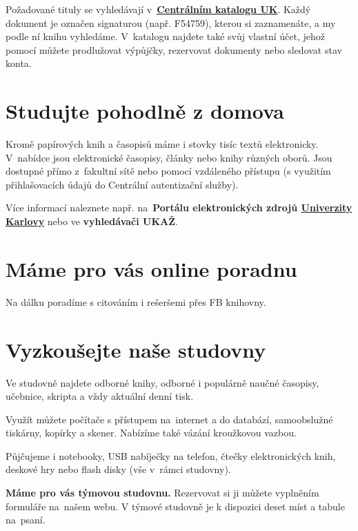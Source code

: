 Požadované tituly se vyhledávají v~\href{http://ckis.cuni.cz/}{\textbf{Centrálním katalogu UK}}. Každý
dokument je označen signaturou (např. F54759), kterou si zaznamenáte,
a my podle ní knihu vyhledáme. V~katalogu najdete také svůj vlastní
účet, jehož pomocí můžete prodlužovat výpůjčky, rezervovat dokumenty nebo
sledovat stav konta.

\ikonka{\faBed}
\section{Studujte pohodlně z domova}
Kromě papírových knih a časopisů máme i
stovky tisíc textů elektronicky.  V~nabídce jsou elektronické
časopisy, články nebo knihy různých oborů. Jsou dostupné přímo
z~fakultní sítě nebo pomocí vzdáleného přístupu (s využitím
přihlašovacích údajů do Centrální autentizační služby).

Více informací naleznete např. na~\textbf{Portálu elektronických zdrojů
  {\href{https://ezdroje.cuni.cz}{Univerzity Karlovy}}} nebo ve \textbf{vyhledávači UKAŽ}.

\ikonka{\faInfoCircle}
\section{Máme pro vás online poradnu} 
Na dálku poradíme s citováním i rešeršemi přes FB knihovny.



\ikonka{\faGraduationCap}
\section{Vyzkoušejte naše studovny}

Ve studovně najdete odborné knihy, odborné i populárně naučné
časopisy, učebnice, skripta a vždy aktuální denní tisk.

Využít můžete počítače s přístupem na~internet a do databází,
samoobslužné tiskárny, kopírky a skener. Nabízíme také vázání kroužkovou vazbou.

Půjčujeme i notebooky, USB nabíječky na
telefon, čtečky elektronických knih, deskové hry nebo flash disky (vše
v~rámci studovny).

\textbf{Máme pro vás týmovou studovnu.} Rezervovat si ji můžete
vyplněním formuláře na~našem webu. V týmové studovně je k dispozici deset míst
a tabule na~psaní.

